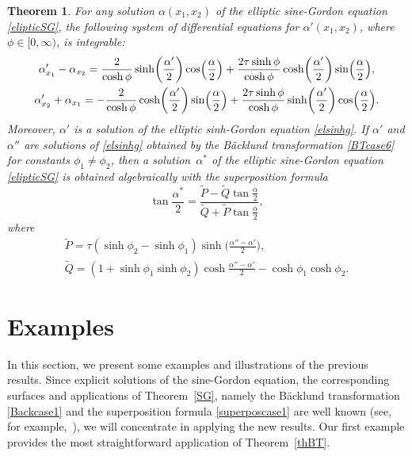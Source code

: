 \documentclass[pdftex]{sigma}
\numberwithin{equation}{section}
\newtheorem{Theorem}{Theorem}[section]
\begin{document}
\begin{Theorem}\label{elipticSinegordon}
 For any solution $\alpha(x_1,x_2)$ of the elliptic sine-Gordon equation \eqref{elipticSG},
the following system of differential equations for $\alpha'(x_1,x_2)$, where $\phi\in [0,\infty)$, is integrable:
\begin{gather}
\alpha'_{x_1}-\alpha_{x_2}=\frac{2}{\cosh\phi}\sinh\biggl(\frac{\alpha'}{2}\biggr)\cos\Bigl(\frac{\alpha}{2}\Bigr)+\frac{2\tau\sinh\phi}{\cosh\phi} \cosh\biggl(\frac{\alpha'}{2}\biggr)\sin\Bigl(\frac{\alpha}{2}\Bigr),\nonumber\\
\alpha'_{x_2}+\alpha_{x_1}=-\frac{2}{\cosh\phi}\cosh\biggl(\frac{\alpha'}{2}\biggr)\sin\Bigl(\frac{\alpha}{2}\Bigr)+\frac{2\tau\sinh\phi}{\cosh\phi} \sinh\biggl(\frac{\alpha'}{2}\biggr)\cos\Bigl(\frac{\alpha}{2}\Bigr).\label{BTcase6}
\end{gather}
 Moreover, $\alpha'$ is a solution of the elliptic sinh-Gordon equation \eqref{elsinhg}. If $\alpha'$ and $\alpha''$ are solutions of \eqref{elsinhg} obtained by the B\"acklund transformation \eqref{BTcase6} for constants $\phi_1\neq \phi_2$, then a solution~$\alpha^*$ of the elliptic sine-Gordon equation \eqref{elipticSG} is obtained algebraically with the superposition formula
\begin{equation}\label{superposcase6}
\tan \frac{\alpha^*}{2}= \frac{\tilde{P}-\tilde{Q}{\tan \frac{\alpha}{2} } }{\tilde{Q}+\tilde{P} {\tan\frac{\alpha}{2}} },
\end{equation}
where
\begin{gather*}
\tilde{P}=\tau(\sinh \phi_2-\sinh \phi_1) \sinh\biggl(\frac{\alpha''-\alpha'}{2}\biggr),
\\
\tilde{Q}=(1+\sinh\phi_1\sinh\phi_2)\cosh\frac{\alpha''-\alpha'}{2}-\cosh\phi_1\cosh\phi_2.
\end{gather*}
\end{Theorem}

\section{Examples}\label{examples}
In this section, we present some examples and illustrations of the previous results. Since explicit solutions of the sine-Gordon equation, the corresponding surfaces and applications of Theorem~\ref{SG}, namely the B\"acklund transformation \eqref{Backcase1} and the superposition formula \eqref{superposcase1} are well known (see, for example,~\cite{Tenenblat1998}), we will concentrate in applying the new results. Our first example provides the most straightforward application of Theorem~\ref{thBT}.
\end{document}

